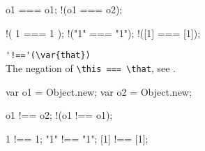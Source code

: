 \begin{urbiscriptapi}
\begin{urbiassert}
      o1 === o1;
    !(o1 === o2);

    !( 1  ===  1 );
    !("1" === "1");
    !([1] === [1]);
\end{urbiassert}

\item \lstinline|'!=='(\var{that})|\\%
  The negation of \lstinline|\this === \that|, see .
\begin{urbiassert}
var o1 = Object.new;
var o2 = Object.new;

      o1 !== o2;
    !(o1 !== o1);

      1  !==  1;
     "1" !== "1";
     [1] !== [1];
\end{urbiassert}

\end{urbiscriptapi}

